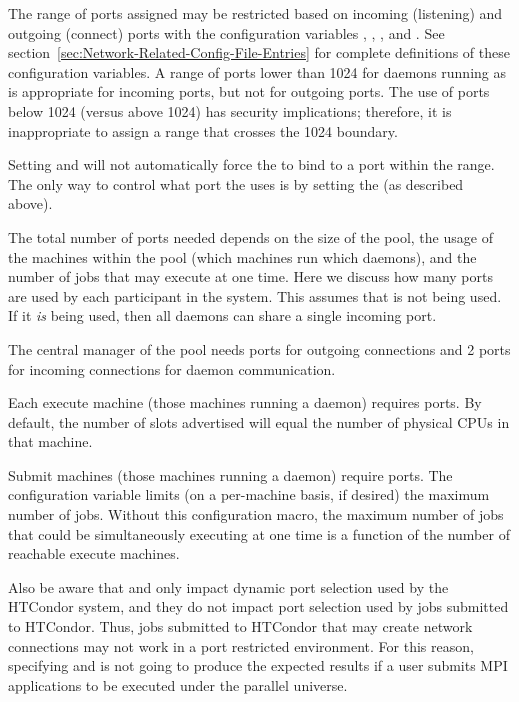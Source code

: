 The range of ports assigned may be restricted based on 
incoming (listening) and outgoing (connect) ports
with the configuration variables
,
,
, and
.
See section~\ref{sec:Network-Related-Config-File-Entries}
for complete definitions of these configuration variables.
A range of ports lower than 1024 for daemons
running as  is appropriate for incoming ports,
but not for outgoing ports.
The use of ports below 1024 (versus above 1024)
has security implications; 
therefore, it is inappropriate to assign a range that crosses
the 1024 boundary.


\Note Setting  and  will not
automatically force the  to bind to a port within
the range.
The only way to control what port the  uses is by
setting the  (as described above).

The total number of ports needed depends on the size of the pool,
the usage of the machines within the pool (which machines
run which daemons),
and the number of jobs that may execute at one time.
Here we discuss how many ports are used by each
participant in the system.  This assumes that 
is not being used.  If it \emph{is} being used, then all daemons
can share a single incoming port.

The central manager of the pool needs
ports for outgoing connections and 2 ports for incoming connections for
daemon communication.

Each execute machine (those machines running a  daemon)
requires
ports.
By default, the number of slots advertised
will equal the number of physical CPUs in that machine.

Submit machines (those machines running a  daemon)
require
 ports.
The configuration variable 
limits (on a per-machine basis, if desired)
the maximum number of jobs.
Without this configuration macro,
the maximum number of jobs that could be simultaneously
executing at one time
is a function of the number of reachable execute machines. 

Also be aware that  and 
only impact dynamic port selection used by the HTCondor system,
and they do not impact port selection used by jobs submitted to HTCondor.
Thus, jobs submitted to HTCondor that may create
network connections may not work in a port restricted environment.
For this reason, specifying  and 
is not going to produce the
expected results if a user submits MPI applications to be executed under
the parallel universe.

